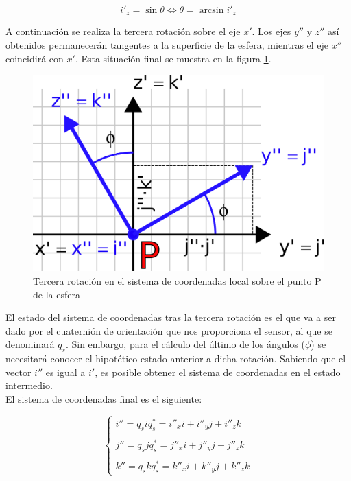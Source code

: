 \documentclass[10pt, a4paper]{report}
\begin{document}
\begin{equation}
i'_z =  \sin \theta \iff \theta = \arcsin i'_z
\end{equation}

A continuación se realiza la tercera rotación sobre el eje $x'$. Los ejes $y''$ y $z''$ así obtenidos permanecerán tangentes a la superficie de la esfera, mientras el eje $x''$ coincidirá con $x'$. Esta situación final se muestra en la figura \ref{fig: esfera_coordenadas}.

\begin{figure}[h]
	\centering
		\includegraphics[scale=2]{../img/sphere_local.png} 
	\caption{Tercera rotación en el sistema de coordenadas local sobre el punto P de la esfera}
	\label{fig: esfera_coordenadas}
\end{figure}

El estado del sistema de coordenadas tras la tercera rotación es el que va a ser dado por el cuaternión de orientación que nos proporciona el sensor, al que se denominará $q_s$. Sin embargo, para el cálculo del último de los ángulos ($\phi$) se necesitará conocer el hipotético estado anterior a dicha rotación. Sabiendo que el vector $i''$ es igual a $i'$, es posible obtener el sistema de coordenadas en el estado intermedio.\\

El sistema de coordenadas final es el siguiente:

$$ \begin{cases}
i'' = q_siq_s^* = i''_x i + i''_y j + i''_z k \\
\\
j'' = q_sjq_s^* = j''_x i + j''_y j + j''_z k \\ 
\\
k'' = q_skq_s^* = k''_x i + k''_y j + k''_z k 
\end{cases}$$
\end{document}
